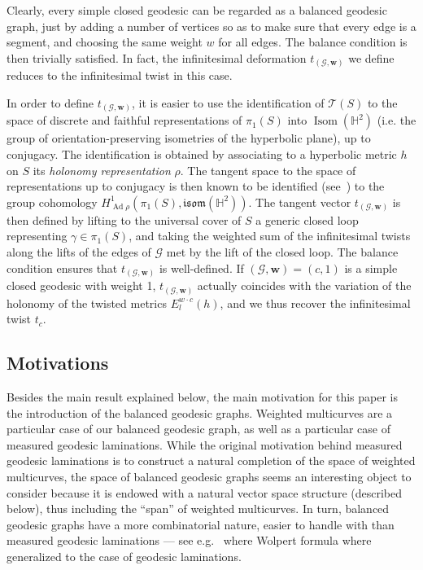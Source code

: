 \documentclass[11pt]{article}
\theoremstyle{definition}
\numberwithin{equation}{section}
\numberwithin{figure}{section}
\numberwithin{table}{section}
\newcommand{\Teich}{\mathcal{T}}
\newcommand{\Hyp}{\mathbb{H}}
\newcommand{\isom}{\mathfrak{isom}}
\DeclareMathOperator{\Isom}{Isom}
\DeclareMathOperator{\Ad}{Ad}
\begin{document}
Clearly, every simple closed geodesic can be regarded as a balanced geodesic graph, just by adding a number of vertices so as to make sure that every edge is a segment, and choosing the same weight $w$ for all edges. The balance condition is then trivially satisfied. In fact, the infinitesimal deformation $t_{(\mathcal G,\mathbf w)}$ we define reduces to the infinitesimal twist in this case.



In order to define $t_{(\mathcal G,\mathbf w)}$, it is easier to use the identification of $\Teich(S)$ to the space of discrete and faithful representations of $\pi_1(S)$ into $\Isom(\Hyp^2)$ (i.e. the group of orientation-preserving isometries of the hyperbolic plane), up to conjugacy. The identification is obtained by associating to a hyperbolic metric $h$ on $S$ its \emph{holonomy representation} $\rho$. The tangent space to the space of representations up to conjugacy is then known to be identified (see~\cite{Goldman}) to the group cohomology $H^1_{\Ad\rho}(\pi_1(S),\isom(\Hyp^2))$. The tangent vector $t_{(\mathcal G,\mathbf w)}$ is then defined by lifting to the universal cover of $S$ a generic closed loop representing $\gamma\in\pi_1(S)$, and taking the weighted sum of the infinitesimal twists along the lifts of the edges of $\mathcal G$ met by the lift of the closed loop. The balance condition ensures that $t_{(\mathcal G,\mathbf w)}$ is well-defined. If $(\mathcal G,\mathbf w)=(c,1)$ is a simple closed geodesic with weight 1, $t_{(\mathcal G,\mathbf w)}$ actually coincides with the variation of the holonomy of the twisted metrics $E_l^{w\cdot c}(h)$, and we thus recover the infinitesimal twist $t_c$.

\subsection{Motivations}

Besides the main result explained below, the main motivation for this paper is the introduction of the balanced geodesic graphs. Weighted multicurves are a particular case of our balanced geodesic graph, as well as a particular case of measured geodesic laminations. While the original motivation behind measured geodesic laminations is to construct a natural completion of the space of weighted multicurves, the space of balanced geodesic graphs seems an interesting object to consider because it is endowed with a natural vector space structure (described below), thus including the ``span'' of weighted multicurves. In turn, balanced geodesic graphs have a more combinatorial nature, easier to handle with than measured geodesic laminations --- see e.g.~\cite{SB} where Wolpert formula where generalized to the case of geodesic laminations.
\end{document}
